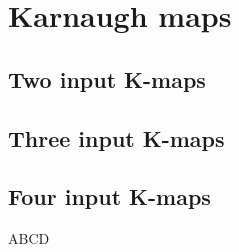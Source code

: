\section{Karnaugh maps}

\subsection{Two input K-maps}
\begin{Karnaughquatre}
\end{Karnaughquatre}

% 

% 
  
\subsection{Three input K-maps}

\begin{Karnaughvuit}
\end{Karnaughvuit}


\subsection{Four input K-maps}
\begin{Karnaugh}{AB}{CD}
\end{Karnaugh}


